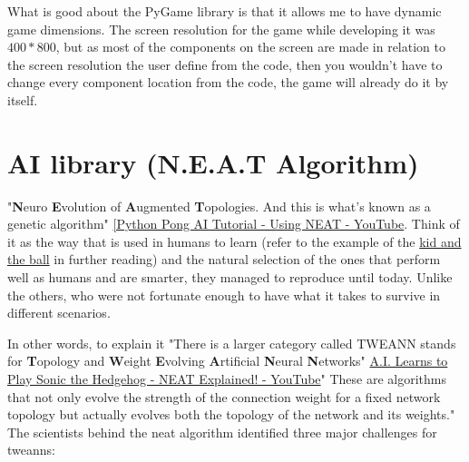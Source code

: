 What is good about the PyGame library is that it allows me to have dynamic game dimensions. The screen resolution for the game while developing it was $400*800$, but as most of the components on the screen are made in relation to the screen resolution the user define from the code, then you wouldn't have to change every component location from the code, the game will already do it by itself.

\section{AI library (N.E.A.T Algorithm)}\label{sec:ai-library-neat-algorithm}
"\textbf{N}euro \textbf{E}volution of \textbf{A}ugmented \textbf{T}opologies. And this is what's known as a genetic algorithm" \href{https://www.youtube.com/watch?v=2f6TmKm7yx0}{[Python Pong AI Tutorial - Using NEAT - YouTube}. Think of it as the way that is used in humans to learn (refer to the example of the \hyperref[sec:ai-life-example]{kid and the ball} in further reading) and the natural selection of the ones that perform well as humans and are smarter, they managed to reproduce until today. Unlike the others, who were not fortunate enough to have what it takes to survive in different scenarios.

In other words, to explain it "There is a larger category called TWEANN stands for \textbf{T}opology and \textbf{W}eight \textbf{E}volving \textbf{A}rtificial \textbf{N}eural \textbf{N}etworks" \href{https://www.youtube.com/watch?v=5RR1T_-zVws&}{A.I. Learns to Play Sonic the Hedgehog - NEAT Explained! - YouTube}" These are algorithms that not only evolve the strength of the connection weight for a fixed network topology but actually evolves both the topology of the network and its weights." The scientists behind the neat algorithm identified three major challenges for tweanns:

